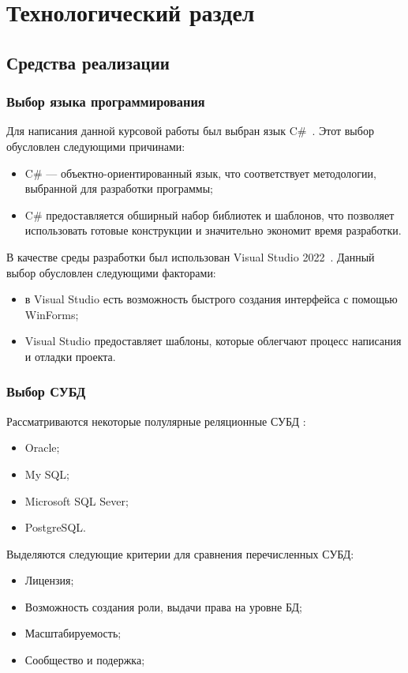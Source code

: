 \section{Технологический раздел}

\subsection{Средства реализации}
\subsubsection{Выбор языка программирования}
Для написания данной курсовой работы был выбран язык C\#~\cite{cpp-lang}.
Этот выбор обусловлен следующими причинами:
\begin{itemize}
	\item C\# --- объектно-ориентированный язык, что соответствует методологии, выбранной для разработки программы;
	\item C\# предоставляется обширный набор библиотек и шаблонов, что позволяет использовать готовые конструкции и значительно экономит время разработки.
\end{itemize}

В качестве среды разработки был использован Visual Studio 2022~\cite{qt-creator}.
Данный выбор обусловлен следующими факторами:
\begin{itemize}
	\item в Visual Studio есть возможность быстрого создания интерфейса с помощью WinForms;
	\item Visual Studio предоставляет шаблоны, которые облегчают процесс написания и отладки проекта.
\end{itemize}

\subsubsection{Выбор СУБД}
Рассматриваются некоторые полулярные реляционные СУБД \cite{dbms}:
\begin{itemize}
	\item Oracle;
	\item My SQL;
	\item Microsoft SQL Sever;
	\item PostgreSQL.
\end{itemize}
Выделяются следующие критерии для сравнения перечисленных СУБД:
\begin{itemize}
	\item Лицензия;
	\item Возможность создания роли, выдачи права на уровне БД;
	\item Масштабируемость;
	\item Сообщество и подержка;
\end{itemize}

